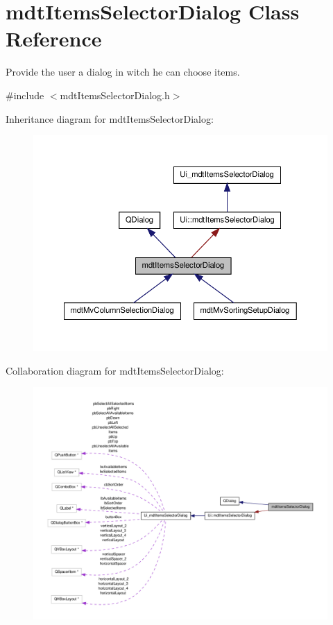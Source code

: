 \hypertarget{classmdt_items_selector_dialog}{\section{mdt\-Items\-Selector\-Dialog Class Reference}
\label{classmdt_items_selector_dialog}
}


Provide the user a dialog in witch he can choose items.  




{\ttfamily \#include $<$mdt\-Items\-Selector\-Dialog.\-h$>$}



Inheritance diagram for mdt\-Items\-Selector\-Dialog\-:
\nopagebreak
\begin{figure}[H]
\begin{center}
\leavevmode
\includegraphics[width=350pt]{classmdt_items_selector_dialog__inherit__graph}
\end{center}
\end{figure}


Collaboration diagram for mdt\-Items\-Selector\-Dialog\-:
\nopagebreak
\begin{figure}[H]
\begin{center}
\leavevmode
\includegraphics[width=350pt]{classmdt_items_selector_dialog__coll__graph}
\end{center}
\end{figure}
